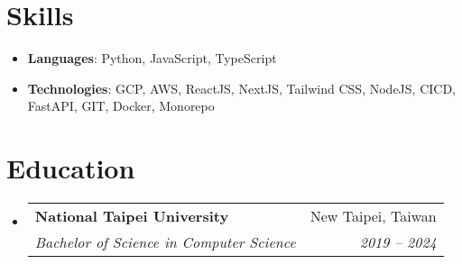 \documentclass[letterpaper,11pt]{article}
\makeatletter
\newcommand{\resumeSubheading}[4]{
  \vspace{-1pt}\item
    \begin{tabular*}{0.97\textwidth}[t]{l@{\extracolsep{\fill}}r}
      \textbf{#1} & #2 \\
      \textit{\small#3} & \textit{\small #4} \\
    \end{tabular*}\vspace{-5pt}
}
\newcommand{\resumeSubHeadingListStart}{\begin{itemize}[leftmargin=*]}
\newcommand{\resumeSubHeadingListEnd}{\end{itemize}}
\makeatother
\begin{document}
%
\section{Skills}
 \resumeSubHeadingListStart
   \item{
     \textbf{Languages}{: Python, JavaScript, TypeScript}
   }
 \resumeSubHeadingListEnd
 \resumeSubHeadingListStart
   \item{
     \textbf{Technologies}{: GCP, AWS, ReactJS, NextJS, Tailwind CSS, NodeJS, CICD, FastAPI, GIT, Docker, Monorepo}
   }
 \resumeSubHeadingListEnd

\section{Education}
\resumeSubHeadingListStart
  \resumeSubheading
    {National Taipei University}{New Taipei, Taiwan}
    {Bachelor of Science in Computer Science}{2019 -- 2024}
\resumeSubHeadingListEnd


\end{document}
